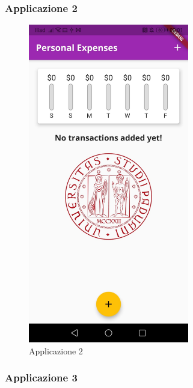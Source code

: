 \newpage

\subsubsection{Applicazione 2}


\begin{figure}[htbp]	
	\centering
	\includegraphics[width=7cm]{immagini/app2.jpeg}
	\caption{Applicazione 2}
	\label{fig:Applicazione 2}
\end{figure}

\newpage

\subsubsection{Applicazione 3}


